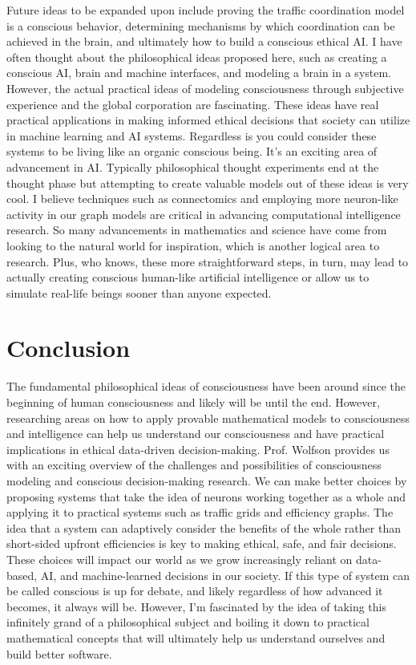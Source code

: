 \documentclass[journal,onecolumn]{IEEEtran}
\begin{document}
Future ideas to be expanded upon include proving the traffic coordination model is a conscious behavior, determining mechanisms by which coordination can be achieved in the brain, and ultimately how to build a conscious ethical AI. I have often thought about the philosophical ideas proposed here, such as creating a conscious AI, brain and machine interfaces, and modeling a brain in a system. However, the actual practical ideas of modeling consciousness through subjective experience and the global corporation are fascinating. These ideas have real practical applications in making informed ethical decisions that society can utilize in machine learning and AI systems. Regardless is you could consider these systems to be living like an organic conscious being. It's an exciting area of advancement in AI. Typically philosophical thought experiments end at the thought phase but attempting to create valuable models out of these ideas is very cool. I believe techniques such as connectomics and employing more neuron-like activity in our graph models are critical in advancing computational intelligence research. So many advancements in mathematics and science have come from looking to the natural world for inspiration, which is another logical area to research. Plus, who knows, these more straightforward steps, in turn, may lead to actually creating conscious human-like artificial intelligence or allow us to simulate real-life beings sooner than anyone expected. 

\section{Conclusion}

The fundamental philosophical ideas of consciousness have been around since the beginning of human consciousness and likely will be until the end. However, researching areas on how to apply provable mathematical models to consciousness and intelligence can help us understand our consciousness and have practical implications in ethical data-driven decision-making. Prof. Wolfson provides us with an exciting overview of the challenges and possibilities of consciousness modeling and conscious decision-making research. We can make better choices by proposing systems that take the idea of neurons working together as a whole and applying it to practical systems such as traffic grids and efficiency graphs. The idea that a system can adaptively consider the benefits of the whole rather than short-sided upfront efficiencies is key to making ethical, safe, and fair decisions. These choices will impact our world as we grow increasingly reliant on data-based, AI, and machine-learned decisions in our society. If this type of system can be called conscious is up for debate, and likely regardless of how advanced it becomes, it always will be. However, I'm fascinated by the idea of taking this infinitely grand of a philosophical subject and boiling it down to practical mathematical concepts that will ultimately help us understand ourselves and build better software. 
\end{document}
